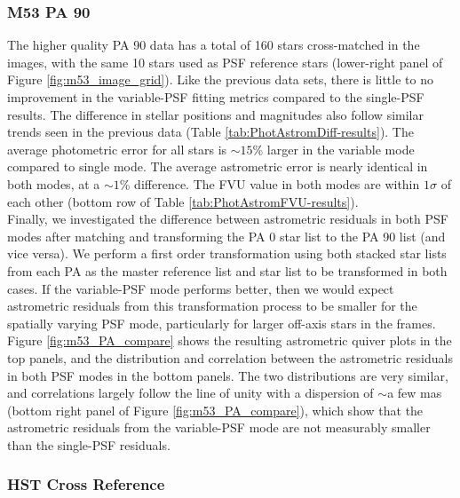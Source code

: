 \documentclass[]{spie}  %
\begin{document}
\subsubsection{M53 PA 90} \label{sec:result-m53-pa90}
The higher quality PA 90 data has a total of 160 stars cross-matched in the images, with the same 10 stars used as PSF reference stars (lower-right panel of Figure \ref{fig:m53_image_grid}). Like the previous data sets, there is little to no improvement in the variable-PSF fitting metrics compared to the single-PSF results. The difference in stellar positions and magnitudes also follow similar trends seen in the previous data (Table \ref{tab:PhotAstromDiff-results}). The average photometric error for all stars is ${\sim}15$\% larger in the variable mode compared to single mode. The average astrometric error is nearly identical in both modes, at a ${\sim}1$\% difference. The FVU value in both modes are within $1\sigma$ of each other (bottom row of Table \ref{tab:PhotAstromFVU-results}). \\
\indent Finally, we investigated the difference between astrometric residuals in both PSF modes after matching and transforming the PA 0 star list to the PA 90 list (and vice versa). We perform a first order transformation using both stacked star lists from each PA as the master reference list and star list to be transformed in both cases. If the variable-PSF mode performs better, then we would expect astrometric residuals from this transformation process to be smaller for the spatially varying PSF mode, particularly for larger off-axis stars in the frames. Figure \ref{fig:m53_PA_compare} shows the resulting astrometric quiver plots in the top panels, and the distribution and correlation between the astrometric residuals in both PSF modes in the bottom panels. The two distributions are very similar, and correlations largely follow the line of unity with a dispersion of ${\sim}$a few mas (bottom right panel of Figure \ref{fig:m53_PA_compare}), which show that the astrometric residuals from the variable-PSF mode are not measurably smaller than the single-PSF residuals.

\subsubsection{HST Cross Reference} \label{sec:m53-hst}
\end{document}
